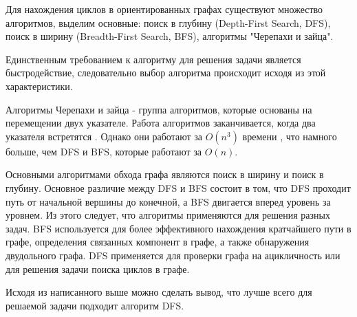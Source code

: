 \def\notedate{2022.11.29}
\def\currentauthor{Журавлев Н.В. (РК6-72Б)}

Для нахождения циклов в ориентированных графах существуют множество алгоритмов, выделим основные: поиск в глубину (Depth-First Search, DFS), поиск в ширину (Breadth-First Search, BFS), алгоритмы "Черепахи и зайца".

Единственным требованием к алгоритму для решения задачи является быстродействие, следовательно выбор алгоритма происходит исходя из этой характеристики.

Алгоритмы Черепахи и зайца - группа алгоритмов, которые основаны на перемещении двух указателе. Работа алгоритмов заканчивается, когда два указателя встретятся \cite{alg-search}. Однако они работают за $O(n^3)$ времени \cite{alg-floyd}, что намного больше, чем DFS и BFS, которые работают за $O(n)$.

Основными алгоритмами обхода графа являются поиск в ширину и поиск в глубину. Основное различие между DFS и BFS состоит в том, что DFS проходит путь от начальной вершины до конечной, а BFS двигается вперед уровень за уровнем. Из этого следует, что алгоритмы применяются для решения разных задач. BFS используется для более эффективного нахождения кратчайшего пути в графе, определения связанных компонент в графе, а также обнаружения двудольного графа. DFS применяется для проверки графа на ацикличность или для решения задачи поиска циклов в графе.

Исходя из написанного выше можно сделать вывод, что лучше всего для решаемой задачи подходит алгоритм DFS.

\noteattributes{}